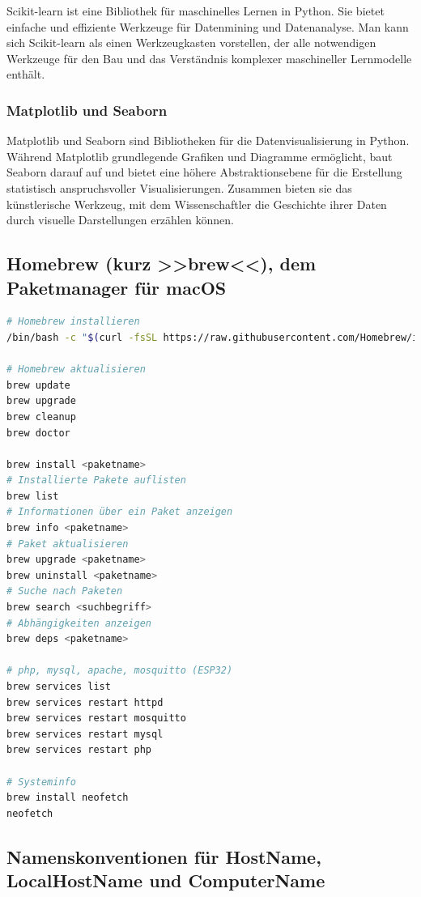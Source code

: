 \documentclass{vorlage-design-main}
\begin{document}
Scikit-learn ist eine Bibliothek für maschinelles Lernen in Python. Sie
bietet einfache und effiziente Werkzeuge für Datenmining und
Datenanalyse. Man kann sich Scikit-learn als einen Werkzeugkasten
vorstellen, der alle notwendigen Werkzeuge für den Bau und das
Verständnis komplexer maschineller Lernmodelle enthält.

\subsubsection{Matplotlib und Seaborn}\label{matplotlib-und-seaborn}

Matplotlib und Seaborn sind Bibliotheken für die Datenvisualisierung in
Python. Während Matplotlib grundlegende Grafiken und Diagramme
ermöglicht, baut Seaborn darauf auf und bietet eine höhere
Abstraktionsebene für die Erstellung statistisch anspruchsvoller
Visualisierungen. Zusammen bieten sie das künstlerische Werkzeug, mit
dem Wissenschaftler die Geschichte ihrer Daten durch visuelle
Darstellungen erzählen können.

\subsection{Homebrew (kurz >>brew<<), dem Paketmanager für
macOS}\label{homebrew-kurz-brew-dem-paketmanager-fuer-macos}

\begin{lstlisting}[language=bash]
# Homebrew installieren
/bin/bash -c "$(curl -fsSL https://raw.githubusercontent.com/Homebrew/install/HEAD/install.sh)"

# Homebrew aktualisieren
brew update
brew upgrade
brew cleanup
brew doctor

brew install <paketname>
# Installierte Pakete auflisten
brew list
# Informationen über ein Paket anzeigen
brew info <paketname>
# Paket aktualisieren
brew upgrade <paketname>
brew uninstall <paketname>
# Suche nach Paketen
brew search <suchbegriff>
# Abhängigkeiten anzeigen
brew deps <paketname>

# php, mysql, apache, mosquitto (ESP32)
brew services list
brew services restart httpd
brew services restart mosquitto
brew services restart mysql
brew services restart php

# Systeminfo
brew install neofetch
neofetch
\end{lstlisting}

\subsection{Namenskonventionen für HostName, LocalHostName und
ComputerName}\label{namenskonventionen-fuer-hostname-localhostname-und-computername}
\end{document}
